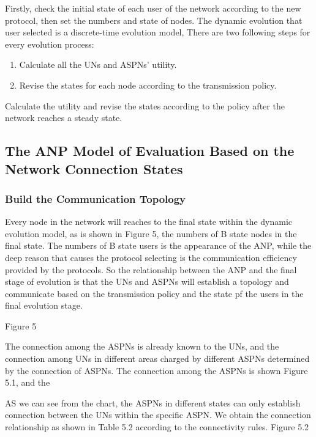 \documentclass{article}
\begin{document}
Firstly, check the initial state of each user of the network according to the new protocol, then set the numbers and state of nodes. The dynamic evolution that user selected is a discrete-time evolution model, There are two following steps for every evolution process:
\begin{enumerate}
    \item Calculate all the UNs and ASPNs' utility.
    \item Revise the states for each node according to the transmission policy.
\end{enumerate}
   Calculate the utility and revise the states according to the policy after the network reaches a steady state. 
\subsection{The ANP Model of Evaluation Based on the Network Connection States}
\subsubsection{Build the Communication Topology}
Every node in the network will reaches to the final state within the dynamic evolution model, as is shown in Figure 5, the numbers of B state nodes in the final state. The numbers of B state users is the appearance of the ANP, while the deep reason that causes the protocol selecting is the communication efficiency provided by the protocols. So the relationship between the ANP and the final stage of evolution is that the UNs and ASPNs will establish a topology and communicate based on the transmission policy and the state pf the users in the final evolution stage.

Figure 5

The connection among the ASPNs is already known to the UNs, and the connection among UNs in different areas charged by different ASPNs determined by the connection of ASPNs. The connection among the ASPNs is shown Figure 5.1, and the 

AS we can see from the chart, the ASPNs in different states can only establish connection between the UNs within the specific ASPN. We obtain the connection relationship as shown in Table 5.2 according to the connectivity rules. 
Figure 5.2
\end{document}

